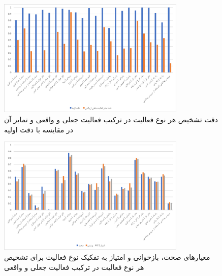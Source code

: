 \begin{figure}[H]
\centerline{\includegraphics[width=0.8\textwidth]{figs/fnatijeh2.png}}
\caption{دقت تشخیص هر نوع فعالیت در ترکیب فعالیت جعلی و واقعی و تمایز آن در مقایسه با دقت اولیه}
\label{fig:fnatijeh2}
\end{figure}

\begin{figure}[H]
\centerline{\includegraphics[width=0.8\textwidth]{figs/fnatijeh21.png}}
\caption{معیارهای صحت، بازخوانی و امتیاز  به تفکیک نوع فعالیت برای تشخیص هر نوع فعالیت در ترکیب فعالیت جعلی و واقعی}
\label{fig:fnatijeh21}
\end{figure}
